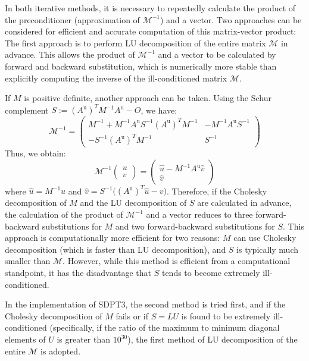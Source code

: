 In both iterative methods, it is necessary to repeatedly calculate the product of the preconditioner (approximation of $\mathcal{M}^{-1}$) and a vector.
Two approaches can be considered for efficient and accurate computation of this matrix-vector product:
The first approach is to perform LU decomposition of the entire matrix $\mathcal{M}$ in advance.
This allows the product of $\mathcal{M}^{-1}$ and a vector to be calculated by forward and backward substitution, which is numerically more stable than explicitly computing the inverse of the ill-conditioned matrix $\mathcal{M}$.

If $M$ is positive definite, another approach can be taken. 
Using the Schur complement $S := (A^{\text{u}})^T M^{-1} A^{\text{u}} - O$, we have:
\[
\mathcal{M}^{-1}=\begin{pmatrix}
    M^{-1} + M^{-1} A^{\text{u}} S^{-1} (A^{\text{u}})^T M^{-1} & -M^{-1} A^{\text{u}} S^{-1} \\
    -S^{-1} (A^{\text{u}})^T M^{-1} & S^{-1}
\end{pmatrix}
\]
Thus, we obtain:
\[
    \mathcal{M}^{-1}\begin{pmatrix}u \\ v \end{pmatrix} = \begin{pmatrix} \hat{u} - M^{-1} A^{\text{u}} \hat{v} \\ \hat{v} \end{pmatrix}
\]
where $\hat{u} = M^{-1} u$ and $\hat{v} = S^{-1}\big((A^{\text{u}})^T \hat{u} - v \big)$.
Therefore, if the Cholesky decomposition of $M$ and the LU decomposition of $S$ are calculated in advance, the calculation of the product of $\mathcal{M}^{-1}$ and a vector reduces to three forward-backward substitutions for $M$ and two forward-backward substitutions for $S$.
This approach is computationally more efficient for two reasons: $M$ can use Cholesky decomposition (which is faster than LU decomposition), and $S$ is typically much smaller than $\mathcal{M}$.
However, while this method is efficient from a computational standpoint, it has the disadvantage that $S$ tends to become extremely ill-conditioned.

In the implementation of SDPT3, the second method is tried first, and if the Cholesky decomposition of $M$ fails or if $S=LU$ is found to be extremely ill-conditioned (specifically, if the ratio of the maximum to minimum diagonal elements of $U$ is greater than $10^{30}$), the first method of LU decomposition of the entire $\mathcal{M}$ is adopted.

